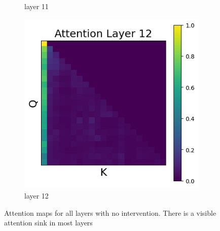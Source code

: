 \documentclass[11pt]{article}
\begin{document}
\begin{figure}[t]
\begin{subfigure}[t]{0.24\textwidth}
    \caption{layer 11}
  \end{subfigure}\hfill
  \begin{subfigure}[t]{0.24\textwidth}
    \centering
    \includegraphics[width=1.4\columnwidth]{figures/no_intervention/layer_12.png}
    \caption{layer 12}
  \end{subfigure}\hfill

  \caption{Attention maps for all layers with no intervention. There is a visible attention sink in most layers}
\end{figure}
\end{document}
